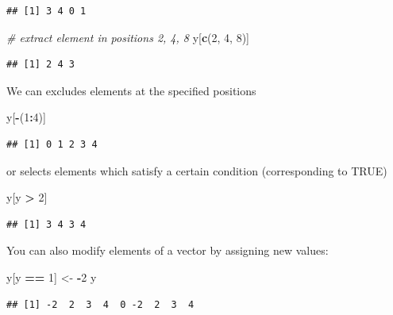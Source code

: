\documentclass[
]{article}
\newenvironment{Shaded}{\begin{snugshade}}{\end{snugshade}}
\newcommand{\CommentTok}[1]{\textcolor[rgb]{0.56,0.35,0.01}{\textit{#1}}}
\newcommand{\DecValTok}[1]{\textcolor[rgb]{0.00,0.00,0.81}{#1}}
\newcommand{\FunctionTok}[1]{\textcolor[rgb]{0.13,0.29,0.53}{\textbf{#1}}}
\newcommand{\NormalTok}[1]{#1}
\newcommand{\OtherTok}[1]{\textcolor[rgb]{0.56,0.35,0.01}{#1}}
\newcommand{\SpecialCharTok}[1]{\textcolor[rgb]{0.81,0.36,0.00}{\textbf{#1}}}
\begin{document}
\begin{verbatim}
## [1] 3 4 0 1
\end{verbatim}

\begin{Shaded}
\begin{Highlighting}[]
\CommentTok{\# extract element in positions 2, 4, 8}
\NormalTok{y[}\FunctionTok{c}\NormalTok{(}\DecValTok{2}\NormalTok{, }\DecValTok{4}\NormalTok{, }\DecValTok{8}\NormalTok{)]}
\end{Highlighting}
\end{Shaded}

\begin{verbatim}
## [1] 2 4 3
\end{verbatim}

We can excludes elements at the specified positions

\begin{Shaded}
\begin{Highlighting}[]
\NormalTok{y[}\SpecialCharTok{{-}}\NormalTok{(}\DecValTok{1}\SpecialCharTok{:}\DecValTok{4}\NormalTok{)]}
\end{Highlighting}
\end{Shaded}

\begin{verbatim}
## [1] 0 1 2 3 4
\end{verbatim}

or selects elements which satisfy a certain condition (corresponding to
TRUE)

\begin{Shaded}
\begin{Highlighting}[]
\NormalTok{y[y }\SpecialCharTok{\textgreater{}} \DecValTok{2}\NormalTok{]}
\end{Highlighting}
\end{Shaded}

\begin{verbatim}
## [1] 3 4 3 4
\end{verbatim}

You can also modify elements of a vector by assigning new values:

\begin{Shaded}
\begin{Highlighting}[]
\NormalTok{y[y }\SpecialCharTok{==} \DecValTok{1}\NormalTok{] }\OtherTok{\textless{}{-}} \SpecialCharTok{{-}}\DecValTok{2}
\NormalTok{y}
\end{Highlighting}
\end{Shaded}

\begin{verbatim}
## [1] -2  2  3  4  0 -2  2  3  4
\end{verbatim}
\end{document}
